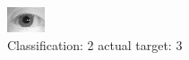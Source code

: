 \begin{figure}[h!]
\begin{center}
\includegraphics[width=0.60\columnwidth]{figures/ID1116_class_2_target_3.png}
\end{center}
\caption{ Classification: 2 actual target: 3}
\label{fig:ID1116_class_2_target_3}
\end{figure}
